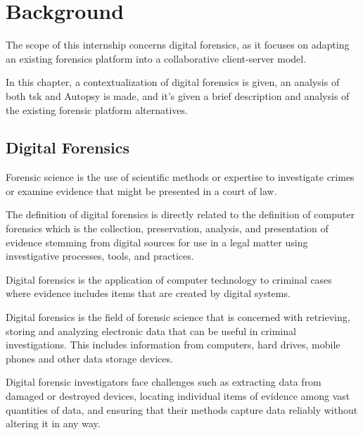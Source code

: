 
\chapter{Background}
\label{ch:background}

The scope of this internship concerns digital forensics, as it focuses on adapting an existing forensics platform into a collaborative client-server model.

In this chapter, a contextualization of digital forensics is given, an analysis of both \acrfull{tsk} \cite{sleuthkit} and Autopsy is made, and it's given a brief description and analysis of the existing forensic platform alternatives.

\section{Digital Forensics}

Forensic science \cite{nist} is the use of scientific methods or expertise to investigate crimes
or examine evidence that might be presented in a court of law.

The definition of digital forensics is directly related to the definition of
computer forensics which is the collection, preservation, analysis,
and presentation \cite{daniels} of evidence stemming from digital sources for use in a legal matter
using investigative processes, tools, and practices.

Digital forensics \cite{nist2} is the application of computer technology to criminal cases where evidence
includes items that are created by digital systems.

Digital forensics is the field of forensic science that is concerned with retrieving,
storing and analyzing electronic data that can be useful in criminal investigations.
This includes information from computers, hard drives, mobile phones and other data
storage devices.

Digital forensic investigators face challenges such as extracting data from damaged or destroyed
devices, locating individual items of evidence among vast quantities of data,
and ensuring that their methods capture data reliably without altering it in any way.

